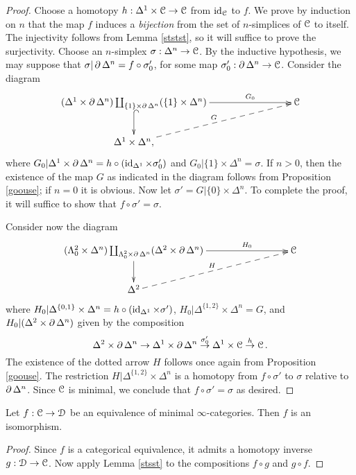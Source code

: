 \begin{proof}
Choose a homotopy $h: \Delta^1 \times \operatorname{\mathcal{C}} \rightarrow \operatorname{\mathcal{C}}$ from $\operatorname{id}_{\operatorname{\mathcal{C}}}$ to $f$.
We prove by induction on $n$ that the map $f$ induces a {\em bijection} from the set of
$n$-simplices of $\operatorname{\mathcal{C}}$ to itself. The injectivity follows from Lemma \ref{ststst}, so it will suffice to prove the surjectivity. Choose an $n$-simplex $\sigma: \Delta^n \rightarrow \operatorname{\mathcal{C}}$.
By the inductive hypothesis, we may suppose that
$\sigma| \operatorname{\partial} \Delta^n = f \circ \sigma'_0$, for some map $\sigma'_0: \operatorname{\partial} \Delta^n \rightarrow \operatorname{\mathcal{C}}$.
Consider the diagram
$$ \xymatrix{ (\Delta^1 \times \bd \Delta^n) \coprod_{ \{1\} \times \bd \Delta^n } (\{1\} \times \Delta^n) \ar[rrr]^-{G_0} \ar@{^{(}->}[d] & & & \calC \\
\Delta^1 \times \Delta^n, \ar@{-->}[urrr]^{G} & &  & }$$
where $G_0| \Delta^1 \times \operatorname{\partial} \Delta^n = h \circ (\operatorname{id}_{\Delta^1} \times \sigma'_0)$ and
$G_0 | \{1\} \times \Delta^n = \sigma$. If $n > 0$, then the existence of the map $G$ as indicated in the diagram follows from Proposition \ref{goouse}; if $n=0$ it is obvious. Now let
$\sigma' = G| \{0\} \times \Delta^n$. To complete the proof, it will suffice to show that
$f \circ \sigma' = \sigma$.

Consider now the diagram
$$ \xymatrix{ (\Lambda^2_0 \times \Delta^n) \coprod_{ \Lambda^2_0 \times \bd \Delta^n } ( \Delta^2 \times \bd \Delta^n) \ar[rrr]^-{H_0} \ar[d] & & & \calC \\
\Delta^2 \ar@{-->}[urrr]^{H} & & &  }$$
where $H_0 | \Delta^{ \{0,1\} } \times \Delta^n = h \circ (\operatorname{id}_{\Delta^1} \times \sigma')$, $H_0 | \Delta^{ \{1,2\}} \times \Delta^n = G$, and $H_0| (\Delta^2 \times \operatorname{\partial} \Delta^n)$ given by the composition
$$ \Delta^2 \times \operatorname{\partial} \Delta^n \rightarrow \Delta^1 \times \operatorname{\partial} \Delta^n \stackrel{\sigma'_0}{\rightarrow} \Delta^1 \times \operatorname{\mathcal{C}} \stackrel{h}{\rightarrow} \operatorname{\mathcal{C}}.$$
The existence of the dotted arrow $H$ follows once again from Proposition \ref{goouse}.
The restriction $H| \Delta^{ \{1,2\} } \times \Delta^n$ is a homotopy from $f \circ \sigma'$
to $\sigma$ relative to $\operatorname{\partial} \Delta^n$. Since $\operatorname{\mathcal{C}}$ is minimal, we conclude that
$f \circ \sigma' = \sigma$ as desired.
\end{proof}

\begin{proposition}
Let $f: \operatorname{\mathcal{C}} \rightarrow \operatorname{\mathcal{D}}$ be an equivalence of minimal $\infty$-categories. Then
$f$ is an isomorphism.
\end{proposition}

\begin{proof}
Since $f$ is a categorical equivalence, it admits a homotopy inverse $g: \operatorname{\mathcal{D}} \rightarrow \operatorname{\mathcal{C}}$.
Now apply Lemma \ref{stsst} to the compositions $f \circ g$ and $g \circ f$.
\end{proof}

